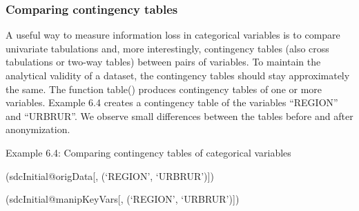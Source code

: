 \documentclass[letterpaper,10pt,english]{sphinxmanual}
\begin{document}
\subsubsection{Comparing contingency tables}
\label{\detokenize{utility:comparing-contingency-tables}}
A useful way to measure information loss in categorical variables is to
compare univariate tabulations and, more interestingly, contingency
tables (also cross tabulations or two-way tables) between pairs of
variables. To maintain the analytical validity of a dataset, the
contingency tables should stay approximately the same. The function
table() produces contingency tables of one or more variables. Example
6.4 creates a contingency table of the variables “REGION” and “URBRUR”.
We observe small differences between the tables before and after
anonymization.

Example 6.4: Comparing contingency tables of categorical variables

\begin{DUlineblock}{0em}
\item[] 
\item[] (sdcInitial@origData{[}, (‘REGION’, ‘URBRUR’){]}) 
\end{DUlineblock}

\begin{DUlineblock}{0em}
\item[] 
\item[] 
\item[] 
\item[] 
\item[] 
\item[] 
\item[] 
\item[] 
\end{DUlineblock}

(sdcInitial@manipKeyVars{[}, (‘REGION’, ‘URBRUR’){]}) 
\end{document}
